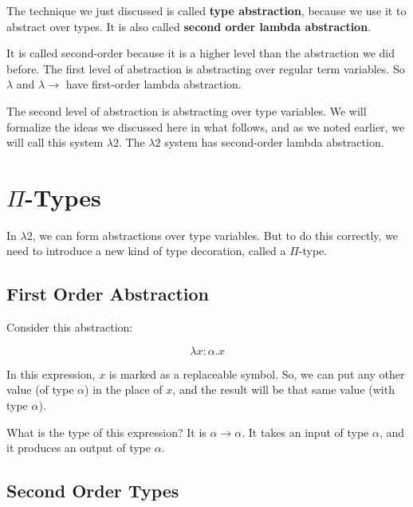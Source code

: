 \documentclass{book}
\numberwithin{equation}{chapter}
\newcommand{\vocab}{\textbf}
\begin{document}
The technique we just discussed is called \vocab{type abstraction}, because we use it to abstract over types. It is also called \vocab{second order lambda abstraction}. 

It is called second-order because it is a higher level than the abstraction we did before. The first level of abstraction is abstracting over regular term variables. So $\lambda$ and $\lambda\rightarrow$ have first-order lambda abstraction. 

The second level of abstraction is abstracting over type variables. We will formalize the ideas we discussed here in what follows, and as we noted earlier, we will call this system $\lambda 2$. The $\lambda 2$ system has second-order lambda abstraction.


\chapter{$\Pi$-Types}

In $\lambda 2$, we can form abstractions over type variables. But to do this correctly, we need to introduce a new kind of type decoration, called a $\Pi$-type.


\section{First Order Abstraction}

Consider this abstraction:

\begin{equation}
\lambda x: \alpha.x
\end{equation}

\noindent
In this expression, $x$ is marked as a replaceable symbol. So, we can put any other value (of type $\alpha$) in the place of $x$, and the result will be that same value (with type $\alpha$).

What is the type of this expression? It is $\alpha \rightarrow \alpha$. It takes an input of type $\alpha$, and it produces an output of type $\alpha$.


\section{Second Order Types}
\end{document}
